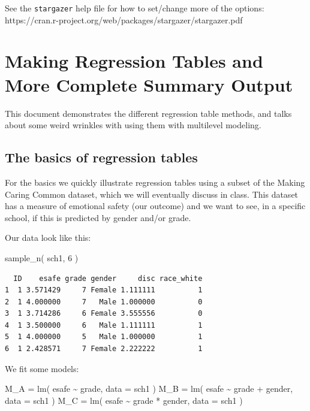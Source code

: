 \documentclass[
  letterpaper,
  DIV=11,
  numbers=noendperiod]{scrreprt}
\newenvironment{Shaded}{\begin{snugshade}}{\end{snugshade}}
\newcommand{\AttributeTok}[1]{\textcolor[rgb]{0.49,0.56,0.16}{#1}}
\newcommand{\DecValTok}[1]{\textcolor[rgb]{0.25,0.63,0.44}{#1}}
\newcommand{\FunctionTok}[1]{\textcolor[rgb]{0.02,0.16,0.49}{#1}}
\newcommand{\NormalTok}[1]{\textcolor[rgb]{0.00,0.44,0.13}{#1}}
\newcommand{\OtherTok}[1]{\textcolor[rgb]{0.00,0.44,0.13}{#1}}
\newcommand{\SpecialCharTok}[1]{\textcolor[rgb]{0.25,0.44,0.63}{#1}}
\begin{document}
See the \texttt{stargazer} help file for how to set/change more of the
options: https://cran.r-project.org/web/packages/stargazer/stargazer.pdf

\hypertarget{making-regression-tables-and-more-complete-summary-output}{%
\chapter{Making Regression Tables and More Complete Summary
Output}\label{making-regression-tables-and-more-complete-summary-output}}

This document demonstrates the different regression table methods, and
talks about some weird wrinkles with using them with multilevel
modeling.

\hypertarget{the-basics-of-regression-tables}{%
\section{The basics of regression
tables}\label{the-basics-of-regression-tables}}

For the basics we quickly illustrate regression tables using a subset of
the Making Caring Common dataset, which we will eventually discuss in
class. This dataset has a measure of emotional safety (our outcome) and
we want to see, in a specific school, if this is predicted by gender
and/or grade.

Our data look like this:

\begin{Shaded}
\begin{Highlighting}[]
\FunctionTok{sample\_n}\NormalTok{( sch1, }\DecValTok{6}\NormalTok{ )}
\end{Highlighting}
\end{Shaded}

\begin{verbatim}
  ID    esafe grade gender     disc race_white
1  1 3.571429     7 Female 1.111111          1
2  1 4.000000     7   Male 1.000000          0
3  1 3.714286     6 Female 3.555556          0
4  1 3.500000     6   Male 1.111111          1
5  1 4.000000     5   Male 1.000000          1
6  1 2.428571     7 Female 2.222222          1
\end{verbatim}

We fit some models:

\begin{Shaded}
\begin{Highlighting}[]
\NormalTok{M\_A }\OtherTok{=} \FunctionTok{lm}\NormalTok{( esafe }\SpecialCharTok{\textasciitilde{}}\NormalTok{ grade, }\AttributeTok{data =}\NormalTok{ sch1 )}
\NormalTok{M\_B }\OtherTok{=} \FunctionTok{lm}\NormalTok{( esafe }\SpecialCharTok{\textasciitilde{}}\NormalTok{ grade }\SpecialCharTok{+}\NormalTok{ gender, }\AttributeTok{data =}\NormalTok{ sch1 )}
\NormalTok{M\_C }\OtherTok{=} \FunctionTok{lm}\NormalTok{( esafe }\SpecialCharTok{\textasciitilde{}}\NormalTok{ grade }\SpecialCharTok{*}\NormalTok{ gender, }\AttributeTok{data =}\NormalTok{ sch1 )}
\end{Highlighting}
\end{Shaded}
\end{document}
